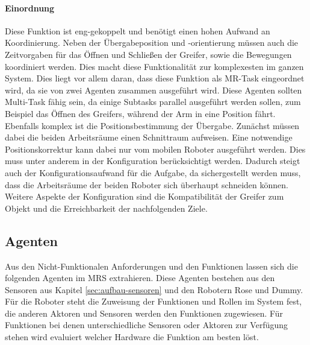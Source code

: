 \paragraph{Einordnung}
Diese Funktion ist eng-gekoppelt und benötigt einen hohen Aufwand an Koordinierung. Neben der Übergabeposition und -orientierung müssen auch die Zeitvorgaben für das Öffnen und Schließen der Greifer, sowie die Bewegungen koordiniert werden. Dies macht diese Funktionalität zur komplexesten im ganzen System. Dies liegt vor allem daran, dass diese Funktion als MR-Task eingeordnet wird, da sie von zwei Agenten zusammen ausgeführt wird. Diese Agenten sollten Multi-Task fähig sein, da einige Subtasks parallel ausgeführt werden sollen, zum Beispiel das Öffnen des Greifers, während der Arm in eine Position fährt. Ebenfalls komplex ist die Positionsbestimmung der Übergabe. Zunächst müssen dabei die beiden Arbeitsräume einen Schnittraum aufweisen. Eine notwendige Positionskorrektur kann dabei nur vom mobilen Roboter ausgeführt werden. Dies muss unter anderem in der Konfiguration berücksichtigt werden. Dadurch steigt auch der Konfigurationsaufwand für die Aufgabe, da sichergestellt werden muss, dass die Arbeitsräume der beiden Roboter sich überhaupt schneiden können. Weitere Aspekte der Konfiguration sind die Kompatibilität der Greifer zum Objekt und die Erreichbarkeit der nachfolgenden Ziele.


\subsection{Agenten}
Aus den Nicht-Funktionalen Anforderungen und den Funktionen lassen sich die folgenden Agenten im MRS extrahieren. Diese Agenten bestehen aus den Sensoren aus Kapitel \ref{sec:aufbau-sensoren} und den Robotern Rose und Dummy. Für die Roboter steht die Zuweisung der Funktionen und Rollen im System fest, die anderen Aktoren und Sensoren werden den Funktionen zugewiesen. Für Funktionen bei denen unterschiedliche Sensoren oder Aktoren zur Verfügung stehen wird evaluiert welcher Hardware die Funktion am besten löst.

